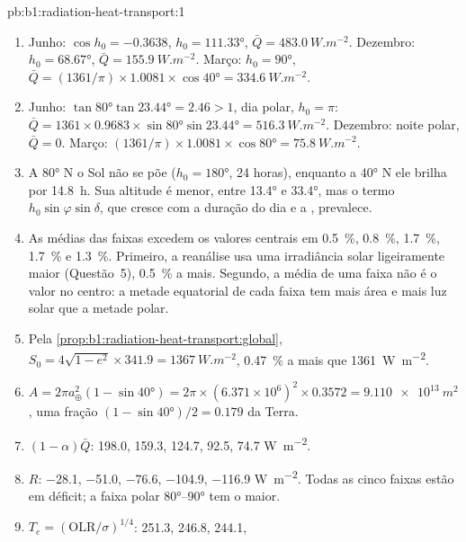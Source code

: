 \begin{solution}{pb:b1:radiation-heat-transport:1}
\begin{enumerate}
  \item Junho: $\cos h_0 = -0.3638$, $h_0 = \ang{111.33}$, $\bar Q =
        \qty{483.0}{W.m^{-2}}$. Dezembro: $h_0 = \ang{68.67}$, $\bar Q =
        \qty{155.9}{W.m^{-2}}$. Março: $h_0 = \ang{90}$, $\bar Q = (1361/\pi)
        \times 1.0081 \times \cos\ang{40} = \qty{334.6}{W.m^{-2}}$.
  \item Junho: $\tan\ang{80}\tan\ang{23.44} = 2.46 > 1$, dia polar, $h_0 = \pi$:
        $\bar Q = 1361 \times 0.9683 \times \sin\ang{80}\sin\ang{23.44} =
        \qty{516.3}{W.m^{-2}}$. Dezembro: noite polar, $\bar Q = 0$. Março:
        $(1361/\pi) \times 1.0081 \times \cos\ang{80} = \qty{75.8}{W.m^{-2}}$.
  \item A \ang{80} N o Sol não se põe ($h_0 = \ang{180}$, 24 horas), enquanto a \ang{40} N ele
        brilha por \qty{14.8}{h}. Sua altitude é menor, entre \ang{13.4} e \ang{33.4}, mas o termo
        $h_0\sin\varphi\sin\delta$, que cresce com a duração do dia e a , prevalece.
  \item As médias das faixas excedem os valores centrais em \qty{0.5}{\percent},
        \qty{0.8}{\percent}, \qty{1.7}{\percent}, \qty{1.7}{\percent} e \qty{1.3}{\percent}.
        Primeiro, a reanálise usa uma irradiância solar ligeiramente maior (Questão~5),
        \qty{0.5}{\percent} a mais. Segundo, a média de uma faixa não é o valor no centro: a metade
        equatorial de cada faixa tem mais área e mais luz solar que a metade polar.
  \item Pela \cref{prop:b1:radiation-heat-transport:global}, $S_0 = 4\sqrt{1-e^2}
        \times 341.9 = \qty{1367}{W.m^{-2}}$, \qty{0.47}{\percent} a mais que \qty{1361}{W.m^{-2}}.
  \item $A = 2\pi a_\oplus^2(1 - \sin\ang{40}) = 2\pi \times (6.371\times10^6)^2
        \times 0.3572 = \qty{9.110e13}{m^2}$, uma fração $(1 - \sin\ang{40})/2 =
        0.179$ da Terra.
  \item $(1 - \alpha)\bar Q$: \num{198.0}, \num{159.3}, \num{124.7}, \num{92.5},
        \num{74.7} \unit{W.m^{-2}}.
  \item $R$: \num{-28.1}, \num{-51.0}, \num{-76.6}, \num{-104.9}, \num{-116.9}
        \unit{W.m^{-2}}. Todas as cinco faixas estão em déficit; a faixa polar \ang{80}--\ang{90} tem o maior.
  \item $T_e = (\text{OLR}/\sigma)^{1/4}$: \num{251.3}, \num{246.8}, \num{244.1},

\end{enumerate}
\end{solution}
